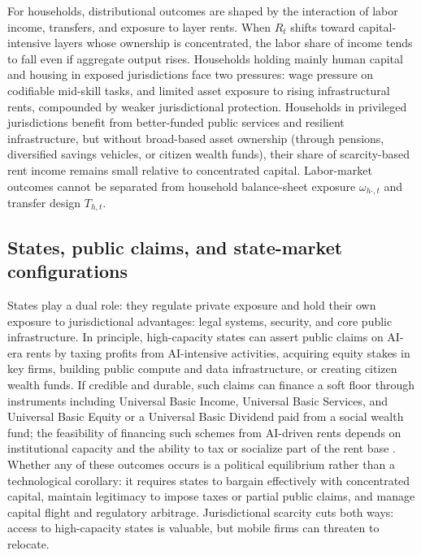 \documentclass[11pt]{article}
\begin{document}
For households, distributional outcomes are shaped by the interaction of labor income, transfers, and exposure to layer rents. When \(R_t\) shifts toward capital-intensive layers whose ownership is concentrated, the labor share of income tends to fall even if aggregate output rises. Households holding mainly human capital and housing in exposed jurisdictions face two pressures: wage pressure on codifiable mid-skill tasks, and limited asset exposure to rising infrastructural rents, compounded by weaker jurisdictional protection. Households in privileged jurisdictions benefit from better-funded public services and resilient infrastructure, but without broad-based asset ownership (through pensions, diversified savings vehicles, or citizen wealth funds), their share of scarcity-based rent income remains small relative to concentrated capital. Labor-market outcomes cannot be separated from household balance-sheet exposure \(\omega_{h\cdot,t}\) and transfer design \(T_{h,t}\).

\subsection{\texorpdfstring{States, public claims, and state-market configurations}{States, public claims, and state-market configurations}}
\label{subsec:statemarket}

States play a dual role: they regulate private exposure and hold their own exposure to jurisdictional advantages: legal systems, security, and core public infrastructure. In principle, high-capacity states can assert public claims on AI-era rents by taxing profits from AI-intensive activities, acquiring equity stakes in key firms, building public compute and data infrastructure, or creating citizen wealth funds. If credible and durable, such claims can finance a soft floor through instruments including Universal Basic Income, Universal Basic Services, and Universal Basic Equity or a Universal Basic Dividend paid from a social wealth fund; the feasibility of financing such schemes from AI-driven rents depends on institutional capacity and the ability to tax or socialize part of the rent base \citep{Nayebi2025}. Whether any of these outcomes occurs is a political equilibrium rather than a technological corollary: it requires states to bargain effectively with concentrated capital, maintain legitimacy to impose taxes or partial public claims, and manage capital flight and regulatory arbitrage. Jurisdictional scarcity cuts both ways: access to high-capacity states is valuable, but mobile firms can threaten to relocate.
\end{document}
